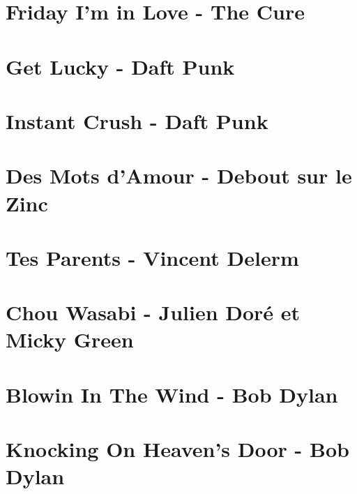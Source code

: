 \documentclass[11pt]{article}
\begin{document}
\section{Friday I'm in Love - The Cure}
\begin{guitar}

\end{guitar}


\section{Get Lucky - Daft Punk}




\section{Instant Crush - Daft Punk}
\begin{guitar}

\end{guitar}

\section{Des Mots d'Amour - Debout sur le Zinc}


\section{Tes Parents - Vincent Delerm}


\section{Chou Wasabi - Julien Doré et Micky Green}
\begin{guitar}

\end{guitar}


\section{Blowin In The Wind - Bob Dylan}
\begin{guitar}

\end{guitar}



\section{Knocking On Heaven's Door - Bob Dylan}
\begin{guitar}

\end{guitar}
\end{document}
